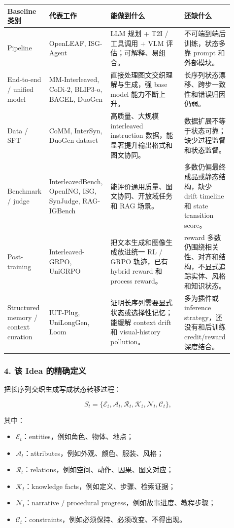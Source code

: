 {\small
\setlength{\tabcolsep}{3pt}
\renewcommand{\arraystretch}{1.12}
\begin{longtable}{p{0.18\linewidth} p{0.21\linewidth} p{0.32\linewidth} p{0.20\linewidth}}
\toprule
\textbf{Baseline 类别} & \textbf{代表工作} & \textbf{能做到什么} & \textbf{还缺什么} \\
\midrule
Pipeline &
OpenLEAF, ISG-Agent &
LLM 规划 + T2I / 工具调用 + VLM 评估；可解释、易组合。 &
不可端到端后训练，状态多靠 prompt 和外部模块。 \\
\midrule
End-to-end / unified model &
MM-Interleaved, CoDi-2, BLIP3-o, BAGEL, DuoGen &
直接处理图文交织理解与生成，强 base model 能力不断上升。 &
长序列状态漂移、跨步一致性和错误归因仍弱。 \\
\midrule
Data / SFT &
CoMM, InterSyn, DuoGen dataset &
高质量、大规模 interleaved instruction 数据，能显著提升输出格式和图文协同。 &
数据扩展不等于状态可靠；缺少过程监督和状态监督。 \\
\midrule
Benchmark / judge &
InterleavedBench, OpenING, ISG, SynJudge, RAG-IGBench &
能评价通用质量、图文协同、开放域任务和 RAG 场景。 &
多数仍偏最终成品或静态结构，缺少 drift timeline 和 state transition score。 \\
\midrule
Post-training &
Interleaved-GRPO, UniGRPO &
把文本生成和图像生成放进统一 RL / GRPO 轨迹，已有 hybrid reward 和 process reward。 &
reward 多数仍围绕相关性、对齐和结构，不显式追踪实体、风格和知识状态。 \\
\midrule
Structured memory / context curation &
IUT-Plug, UniLongGen, Loom &
证明长序列需要显式状态或选择性记忆；能缓解 context drift 和 visual-history pollution。 &
多为插件或 inference strategy，还没有和后训练 credit/reward 深度结合。 \\
\bottomrule
\end{longtable}
}

\subsubsection*{4. 该 Idea 的精确定义}

把长序列交织生成写成状态转移过程：

\[
S_t =
\{\mathcal{E}_t,\mathcal{A}_t,\mathcal{R}_t,\mathcal{K}_t,\mathcal{N}_t,\mathcal{C}_t\},
\]

其中：

\begin{itemize}[leftmargin=1.5em]
  \item $\mathcal{E}_t$：entities，例如角色、物体、地点；
  \item $\mathcal{A}_t$：attributes，例如外观、颜色、服装、风格；
  \item $\mathcal{R}_t$：relations，例如空间、动作、因果、图文对应；
  \item $\mathcal{K}_t$：knowledge facts，例如定义、步骤、检索证据；
  \item $\mathcal{N}_t$：narrative / procedural progress，例如故事进度、教程步骤；
  \item $\mathcal{C}_t$：constraints，例如必须保持、必须改变、不得出现。
\end{itemize}

